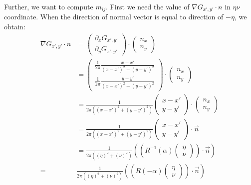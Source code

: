 \documentclass[a4paper,12pt]{article}
\begin{document}
\begin{enumerate}
Further, we want to compute $m_{ij}$. First we need the value of $\nabla G_{x',y'}\cdot n$ in $\eta \nu$ coordinate. When the direction of normal vector is equal to direction of $-\eta$, we obtain:
\begin{align}
 \nabla G_{x',y'}\cdot n&=\left(\begin{array}{c}
      \partial_x G_{x',y'}\\
      \partial_y G_{x',y'}
    \end{array}\right) \cdot \left(\begin{array}{c}
      n_x \\
      n_y
    \end{array}\right)\\
&=\left(\begin{array}{c}
      \frac{1}{2\pi} \frac{x-x'}{(x-x')^2+(y-y')^2} \\
      \frac{1}{2\pi} \frac{y-y'}{(x-x')^2+(y-y')^2}
    \end{array}\right) \cdot \left(\begin{array}{c}
      n_x \\
      n_y
    \end{array}\right)\\
&= \frac{1}{2\pi \left((x-x')^2+(y-y')^2 \right)}\left(\begin{array}{c}
     x-x' \\
     y-y'
    \end{array}\right)\cdot \left(\begin{array}{c}
      n_x \\
      n_y
    \end{array}\right)\\
&= \frac{1}{2\pi \left((x-x')^2+(y-y')^2 \right)}\left(\begin{array}{c}
     x-x' \\
     y-y'
    \end{array}\right)\cdot \vec{n}\\
&=\frac{1}{2\pi \left((\eta)^2+(\nu)^2 \right)} \left(\left(R^{-1}(\alpha)\left(\begin{array}{c}
     \eta \\
     \nu
    \end{array}\right)\right)\cdot \vec{n}\right)\\
=& \frac{1}{2\pi \left((\eta)^2+(\nu)^2 \right)} \left(\left(R(-\alpha)\left(\begin{array}{c}
     \eta \\
     \nu
    \end{array}\right)\right)\cdot \vec{n}\right)\\

\end{align}
\end{enumerate}
\end{document}
